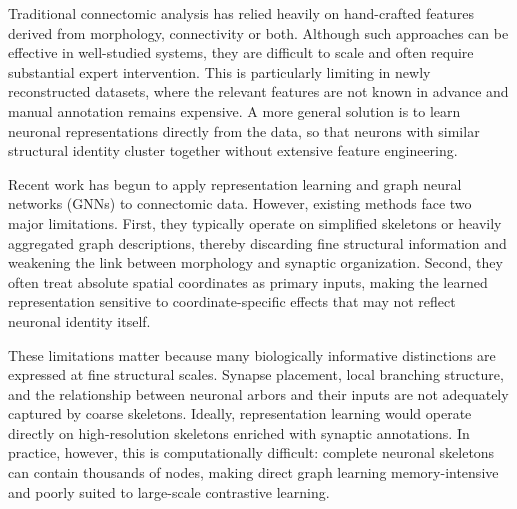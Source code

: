 \documentclass{article}
\begin{document}
Traditional connectomic analysis has relied heavily on hand-crafted features derived from morphology, connectivity or both. Although such approaches can be effective in well-studied systems, they are difficult to scale and often require substantial expert intervention. This is particularly limiting in newly reconstructed datasets, where the relevant features are not known in advance and manual annotation remains expensive. A more general solution is to learn neuronal representations directly from the data, so that neurons with similar structural identity cluster together without extensive feature engineering.

Recent work has begun to apply representation learning and graph neural networks (GNNs) to connectomic data. However, existing methods face two major limitations. First, they typically operate on simplified skeletons or heavily aggregated graph descriptions, thereby discarding fine structural information and weakening the link between morphology and synaptic organization. Second, they often treat absolute spatial coordinates as primary inputs, making the learned representation sensitive to coordinate-specific effects that may not reflect neuronal identity itself.

These limitations matter because many biologically informative distinctions are expressed at fine structural scales. Synapse placement, local branching structure, and the relationship between neuronal arbors and their inputs are not adequately captured by coarse skeletons. Ideally, representation learning would operate directly on high-resolution skeletons enriched with synaptic annotations. In practice, however, this is computationally difficult: complete neuronal skeletons can contain thousands of nodes, making direct graph learning memory-intensive and poorly suited to large-scale contrastive learning.
\end{document}
